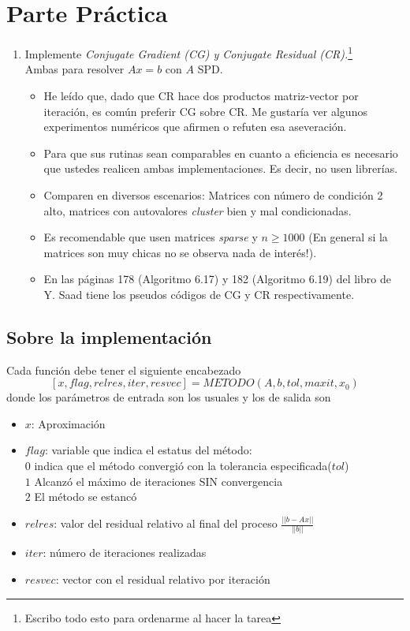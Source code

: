 \documentclass{article}
\begin{document}
\section*{Parte Práctica}
\begin{enumerate}
\item Implemente \textit{Conjugate Gradient (CG) y Conjugate Residual (CR).}\footnote{Escribo todo esto para ordenarme al hacer la tarea}\\
Ambas para resolver $Ax=b$ con $A$ SPD.
\begin{itemize}
\item He leído que, dado que CR hace dos productos matriz-vector por iteración, es común preferir CG sobre CR. Me gustaría ver algunos experimentos numéricos que afirmen o refuten esa aseveración.
\item Para que sus rutinas sean comparables en cuanto a eficiencia es necesario que ustedes realicen ambas implementaciones. Es decir, no usen librerías.
\item Comparen en diversos escenarios: Matrices con número de condición 2 alto, matrices con autovalores \textit{cluster} bien y mal condicionadas.
\item Es recomendable que usen matrices \textit{sparse} y $n\geq 1000$ (En general si la matrices son muy chicas no se observa nada de interés!).
\item En las páginas 178 (Algoritmo 6.17) y 182 (Algoritmo 6.19) del libro de Y. Saad tiene los pseudos códigos de CG y CR respectivamente.

\end{itemize}
\end{enumerate}
\subsection*{Sobre la implementación}
Cada función debe tener el siguiente encabezado
$$[x, flag, relres, iter, resvec] = METODO(A,b,tol,maxit,x_0)$$
donde los parámetros de entrada son los usuales y los de salida son 
\begin{itemize}
\item $x$: Aproximación
\item $flag$: variable que indica el estatus del método:\\
$0$ indica que el método convergió con la tolerancia especificada($tol$)\\
$1$ Alcanzó el máximo de iteraciones SIN convergencia\\
$2$ El método se estancó
\item $relres$: valor del residual relativo al final del proceso $\frac{||b-Ax||}{||b||}$
\item $iter$: número de iteraciones realizadas
\item $resvec$: vector con el residual relativo por iteración
\end{itemize}
\end{document}
